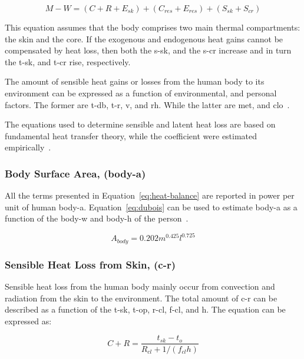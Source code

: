 \begin{equation}
    M - W = (C + R + E_{sk}) + (C_{res} + E_{res}) + (S_{sk} + S_{cr})\label{eq:heat-balance}
\end{equation}

This equation assumes that the body comprises two main thermal compartments: the skin and the core.
If the exogenous and endogenous heat gains cannot be compensated by heat loss, then both the \ac{s-sk}, and the \ac{s-cr} increase and in turn the \ac{t-sk}, and \ac{t-cr} rise, respectively.

The amount of sensible heat gains or losses from the human body to its environment can be expressed as a function of environmental, and personal factors.
The former are \ac{t-db}, \ac{t-r}, \ac{v}, and \ac{rh}.
While the latter are \ac{met}, and \ac{clo}~\cite{ASHRA2017}.

The equations used to determine sensible and latent heat loss are based on fundamental heat transfer theory, while the coefficient were estimated empirically~\cite{ASHRA2017}.

\subsubsection{Body Surface Area, (\acs{body-a})}

All the terms presented in Equation~\ref{eq:heat-balance} are reported in power per unit of human \ac{body-a}.
Equation~\ref{eq:dubois} can be used to estimate \ac{body-a} as a function of the \ac{body-w} and \ac{body-h} of the person~\cite{DuBois}.

\begin{equation}
    A_{body} = 0.202 m^{0.425} l^{0.725}\label{eq:dubois}
\end{equation}


\subsubsection{Sensible Heat Loss from Skin, (\acs{c-r})}

Sensible heat loss from the human body mainly occur from convection and radiation from the skin to the environment.
The total amount of \ac{c-r} can be described as a function of the \ac{t-sk}, \ac{t-op}, \ac{r-cl}, \ac{f-cl}, and \ac{h}.
The equation can be expressed as:

\begin{equation}
    C+R=\frac{t_{s k}-t_{o}}{R_{c l}+1 /\left(f_{c l} h\right)}\label{eq:c-r}
\end{equation}

